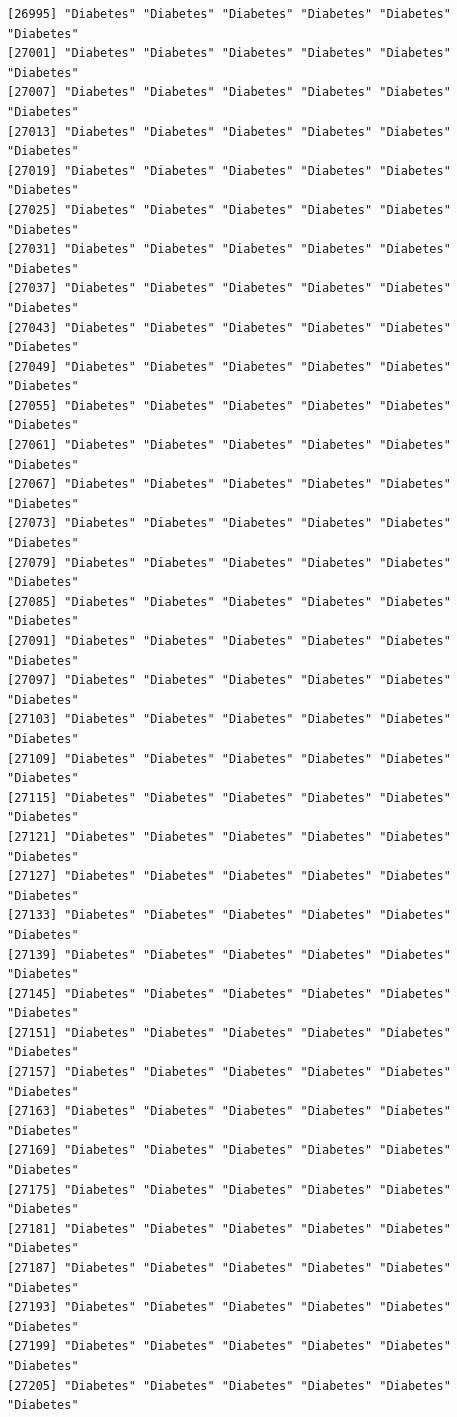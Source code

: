 \documentclass[
  letterpaper,
  DIV=11,
  numbers=noendperiod]{scrartcl}
\begin{document}
\begin{verbatim}
[26995] "Diabetes" "Diabetes" "Diabetes" "Diabetes" "Diabetes" "Diabetes"
[27001] "Diabetes" "Diabetes" "Diabetes" "Diabetes" "Diabetes" "Diabetes"
[27007] "Diabetes" "Diabetes" "Diabetes" "Diabetes" "Diabetes" "Diabetes"
[27013] "Diabetes" "Diabetes" "Diabetes" "Diabetes" "Diabetes" "Diabetes"
[27019] "Diabetes" "Diabetes" "Diabetes" "Diabetes" "Diabetes" "Diabetes"
[27025] "Diabetes" "Diabetes" "Diabetes" "Diabetes" "Diabetes" "Diabetes"
[27031] "Diabetes" "Diabetes" "Diabetes" "Diabetes" "Diabetes" "Diabetes"
[27037] "Diabetes" "Diabetes" "Diabetes" "Diabetes" "Diabetes" "Diabetes"
[27043] "Diabetes" "Diabetes" "Diabetes" "Diabetes" "Diabetes" "Diabetes"
[27049] "Diabetes" "Diabetes" "Diabetes" "Diabetes" "Diabetes" "Diabetes"
[27055] "Diabetes" "Diabetes" "Diabetes" "Diabetes" "Diabetes" "Diabetes"
[27061] "Diabetes" "Diabetes" "Diabetes" "Diabetes" "Diabetes" "Diabetes"
[27067] "Diabetes" "Diabetes" "Diabetes" "Diabetes" "Diabetes" "Diabetes"
[27073] "Diabetes" "Diabetes" "Diabetes" "Diabetes" "Diabetes" "Diabetes"
[27079] "Diabetes" "Diabetes" "Diabetes" "Diabetes" "Diabetes" "Diabetes"
[27085] "Diabetes" "Diabetes" "Diabetes" "Diabetes" "Diabetes" "Diabetes"
[27091] "Diabetes" "Diabetes" "Diabetes" "Diabetes" "Diabetes" "Diabetes"
[27097] "Diabetes" "Diabetes" "Diabetes" "Diabetes" "Diabetes" "Diabetes"
[27103] "Diabetes" "Diabetes" "Diabetes" "Diabetes" "Diabetes" "Diabetes"
[27109] "Diabetes" "Diabetes" "Diabetes" "Diabetes" "Diabetes" "Diabetes"
[27115] "Diabetes" "Diabetes" "Diabetes" "Diabetes" "Diabetes" "Diabetes"
[27121] "Diabetes" "Diabetes" "Diabetes" "Diabetes" "Diabetes" "Diabetes"
[27127] "Diabetes" "Diabetes" "Diabetes" "Diabetes" "Diabetes" "Diabetes"
[27133] "Diabetes" "Diabetes" "Diabetes" "Diabetes" "Diabetes" "Diabetes"
[27139] "Diabetes" "Diabetes" "Diabetes" "Diabetes" "Diabetes" "Diabetes"
[27145] "Diabetes" "Diabetes" "Diabetes" "Diabetes" "Diabetes" "Diabetes"
[27151] "Diabetes" "Diabetes" "Diabetes" "Diabetes" "Diabetes" "Diabetes"
[27157] "Diabetes" "Diabetes" "Diabetes" "Diabetes" "Diabetes" "Diabetes"
[27163] "Diabetes" "Diabetes" "Diabetes" "Diabetes" "Diabetes" "Diabetes"
[27169] "Diabetes" "Diabetes" "Diabetes" "Diabetes" "Diabetes" "Diabetes"
[27175] "Diabetes" "Diabetes" "Diabetes" "Diabetes" "Diabetes" "Diabetes"
[27181] "Diabetes" "Diabetes" "Diabetes" "Diabetes" "Diabetes" "Diabetes"
[27187] "Diabetes" "Diabetes" "Diabetes" "Diabetes" "Diabetes" "Diabetes"
[27193] "Diabetes" "Diabetes" "Diabetes" "Diabetes" "Diabetes" "Diabetes"
[27199] "Diabetes" "Diabetes" "Diabetes" "Diabetes" "Diabetes" "Diabetes"
[27205] "Diabetes" "Diabetes" "Diabetes" "Diabetes" "Diabetes" "Diabetes"

\end{verbatim}
\end{document}

